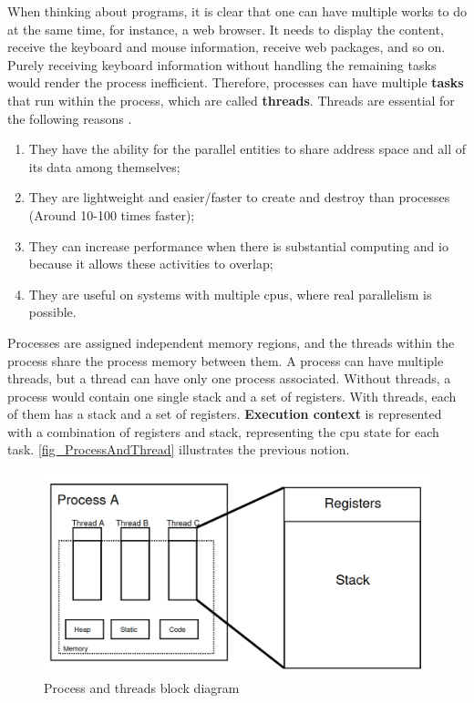 When thinking about programs, it is clear that one can have multiple works to do at the same time, for instance, a web browser. It needs to 
display the content, receive the keyboard and mouse information, receive web packages, and so on. Purely receiving keyboard information without 
handling the remaining tasks would render the process inefficient. Therefore, processes can have multiple \textbf{tasks} that run 
within the process, which are called \textbf{threads}. Threads are essential for the following reasons \cite{OSbook}.

\begin{enumerate}
    \item They have the ability for the parallel entities to share address space and all of its data among themselves;

    \item They are lightweight and easier/faster to create and destroy than processes (Around 10-100 times faster);

    \item They can increase performance when there is substantial computing and \gls{io} because it allows these activities to overlap;

    \item They are useful on systems with multiple \glspl{cpu}, where real parallelism is possible.
\end{enumerate}

Processes are assigned independent memory regions, and the threads within the process share the process memory between them. A process can 
have multiple threads, but a thread can have only one process associated. Without threads, a process would contain one single stack and a set of 
registers. With threads, each of them has a stack and a set of registers. \textbf{Execution context} is represented with a combination of 
registers and stack, representing the \gls{cpu} state for each task. \autoref{fig_ProcessAndThread} illustrates the previous notion. 

\begin{figure}[H]
	\centering
 	\includegraphics[width=0.7\linewidth]{Images/ProcessAndThread.png}
 	\caption{ Process and threads block diagram }
	 \label{fig_ProcessAndThread}
\end{figure}

